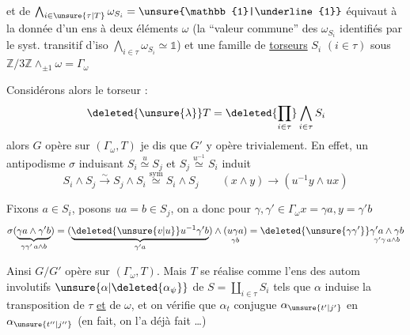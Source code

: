 et de $\bigwedge_{i\in\unsure{\tau|T}}\omega_{S_i}=\unsure{\mathbb{1}|\underline{1}}$ équivaut à la donnée d'un ens à deux éléments $\omega$ (la ``valeur commune'' des $\omega_{S_i}$ identifiés par le syst. transitif d'iso $\bigwedge_{i\in\tau}\omega_{S_i}\simeq\mathbb{1}$) et une famille de \uline{torseurs} $S_i$ $(i\in\tau)$ sous $\mathbb Z/3\mathbb Z\wedge_{\pm1}\omega=\Gamma_\omega$

Considérons alors le \inserted{$\Gamma_\omega$-}torseur :
\[
\deleted{\unsure{\lambda}}T=\deleted{\prod_{i\in\tau}}\bigwedge_{i\in\tau}S_i
\]
alors $G$ opère sur $(\Gamma_\omega,T)$ je dis que $G'$ y opère trivialement. En effet, un antipodisme $\sigma$ induisant $S_i\overset{u}{\simeq}S_j$ et $S_j\overset{u^{-1}}{\simeq}S_i$ induit
\[
S_i\wedge S_j\xrightarrow{\sim}S_j\wedge S_i
\overset{\mathrm{sym}}{\simeq} S_i\wedge S_j
\qquad (x\wedge y)\longrightarrow(u^{-1}y\wedge ux)
\]

 Fixons $a\in S_i$, posons $ua=b\in S_j$, on a donc pour $\gamma,\gamma'\in\Gamma_\omega$\qquad $x=\gamma a,y=\gamma'b$
\[
\sigma(\underbrace{\gamma a\wedge\gamma'b}_{\gamma\gamma'\,a\wedge b})
=(\underbrace{\deleted{\unsure{v|u}}u^{-1}\gamma'b}_{\gamma'a})\wedge
\underset{\gamma b}{(u\gamma a)}
=\deleted{\unsure{\gamma\gamma'}}\underset{\gamma'\gamma\,a\wedge b}{\gamma'a\wedge\gamma b}
\]

Ainsi $G/G'$ opère sur $(\Gamma_\omega,T)$. Mais $T$ se réalise  comme l'ens des  autom involutifs $\unsure{\alpha|\deleted{\alpha_\psi}}$ de $S=\coprod_{i\in\tau}S_i$ tels que $\alpha$ induise la transposition de $\tau$ \uline{et} de $\omega$, et on vérifie que $\alpha_t$ conjugue $\alpha_{\unsure{t'|j'}}$ en $\alpha_{\unsure{t''|j''}}$ (en fait, on l'a déjà fait \ldots)

